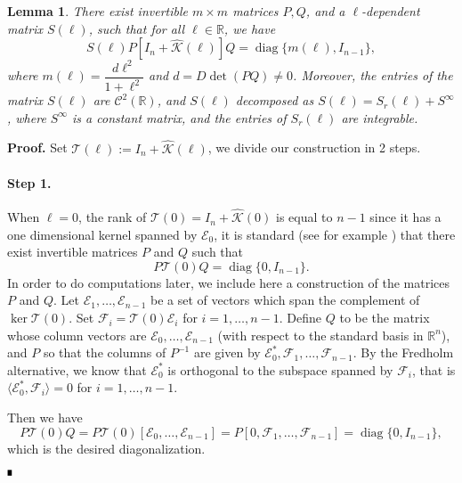 \documentclass[letterpaper,11pt]{article}
\newcommand{\R}{\mathbb{R}}
\newcommand{\K}{\mathcal{K}}
\newcommand{\diag}{\operatorname{diag}}
\numberwithin{equation}{section}
\theoremstyle{plain}
\newtheorem{lemma}[theorem]{Lemma}
\theoremstyle{remark}
\newenvironment{Proof}[1][.]%
 {\begin{trivlist}\item[]\textbf{Proof#1 }}%
 {\hspace*{\fill}$\rule{0.3\baselineskip}{0.35\baselineskip}$\end{trivlist}}
\begin{document}
\begin{lemma}\label{Lem1} There exist invertible $m \times m$ matrices $P, Q$, and a $\ell$-dependent matrix $S(\ell)$, such that for all $\ell \in \R$, we have
\[
S(\ell)P[I_n+\widehat{\K}(\ell)]Q = \diag\{m(\ell),I_{n-1} \},
\]
where $m(\ell) = \dfrac{d\ell^2}{1+\ell^2}$ and $d = D\det(PQ) \neq 0$. Moreover, the entries of the matrix $S(\ell)$ are $\mathscr{C}^2(\R)$, and $S(\ell)$ decomposed as $S(\ell)=S_r(\ell)+S^\infty$, where $S^\infty$ is a constant matrix, and the entries of $S_r(\ell)$ are integrable.  
\end{lemma}
\begin{Proof}Set $\mathcal{T}(\ell) := I_n+\widehat{\K}(\ell)$, we divide our construction in 2 steps.

\paragraph{Step 1.}
 When $\ell = 0$, the rank of $\mathcal{T}(0)=I_n+\widehat{\K}(0)$ is equal to $n-1$ since it has a one dimensional kernel spanned by $\mathcal{E}_0$, it is standard (see for example \cite{roman2007advanced}) that there exist invertible matrices $P$ and $Q$ such that
\[
P\mathcal{T}(0)Q = \diag\{0,I_{n-1}\}.
\]
In order to do computations later, we include here a construction of the matrices $P$ and $Q$. Let $\mathcal{E}_1,\ldots,\mathcal{E}_{n-1}$ be a set of vectors which span the complement of $\ker \mathcal{T}(0)$. Set $\mathcal{F}_i = \mathcal{T}(0)\mathcal{E}_i$ for $i=1,\ldots,n-1$. Define $Q$ to be the matrix whose column vectors are $\mathcal{E}_0,\ldots,\mathcal{E}_{n-1}$ (with respect to the standard basis in $\R^n$), and $P$ so that the columns of $P^{-1}$ are given by $\mathcal{E}_0^*,\mathcal{F}_1,\ldots,\mathcal{F}_{n-1}$. By the Fredholm alternative, we know that $\mathcal{E}_0^*$ is orthogonal to the subspace spanned by $\mathcal{F}_i$, that is $\langle\mathcal{E}_0^*,\mathcal{F}_i\rangle = 0$ for $i=1,\ldots,n-1$. 

 Then we have 
\[
P\mathcal{T}(0)Q = P\mathcal{T}(0)[\mathcal{E}_0,\ldots,\mathcal{E}_{n-1}] = P[0,\mathcal{F}_1,\ldots,\mathcal{F}_{n-1}]=\diag\{0,I_{n-1}\},
\]
which is the desired diagonalization.


\end{Proof}
\end{document}
